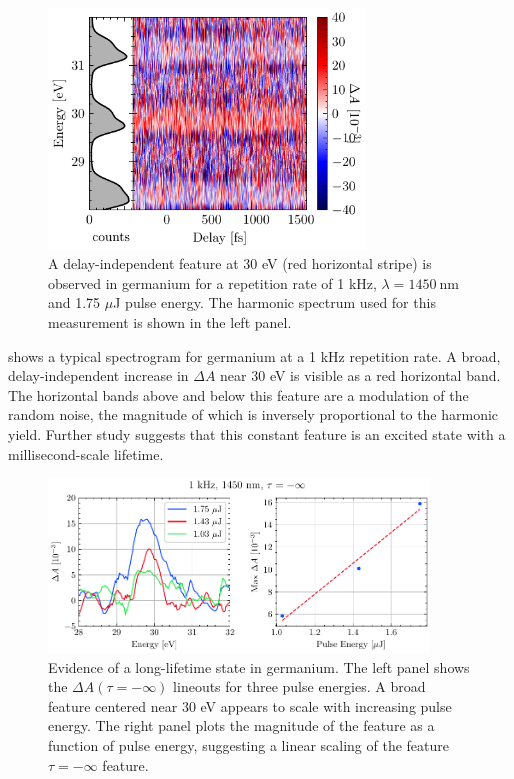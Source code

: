 \begin{figure}
	\centering
	\includegraphics[width=0.75\textwidth]{figures/chap4/ODvsDelay_1kHz_1p75uJ_dark.pdf}
	\caption{A delay-independent feature at 30 eV (red horizontal stripe) is observed in germanium for a repetition rate of 1 kHz, $\lambda = 1450 \ \textrm{nm}$ and 1.75 $\mu$J pulse energy. The harmonic spectrum used for this measurement is shown in the left panel.}
	\label{fig:ODvsDelay_1kHz_1p75uJ_dark}
\end{figure}

 shows a typical spectrogram for germanium at a 1 kHz repetition rate. A broad, delay-independent increase in $\Delta A$ near 30 eV is visible as a red horizontal band. The horizontal bands above and below this feature are a modulation of the random noise, the magnitude of which is inversely proportional to the harmonic yield. Further study suggests that this constant feature is an excited state with a millisecond-scale lifetime.

\begin{figure}
	\centering
	\includegraphics[width=0.90\textwidth]{figures/chap4/neg_inf_PulseEnergy_scaling_1kHz.pdf}
	\caption{Evidence of a long-lifetime state in germanium. The left panel shows the $\Delta A(\tau=-\infty)$ lineouts for three pulse energies. A broad feature centered near 30 eV appears to scale with increasing pulse energy. The right panel plots the magnitude of the feature as a function of pulse energy, suggesting a linear scaling of the feature $\tau=-\infty$ feature.}
	\label{fig:neg_inf_PulseEnergy_scaling_1kHz}
\end{figure}

